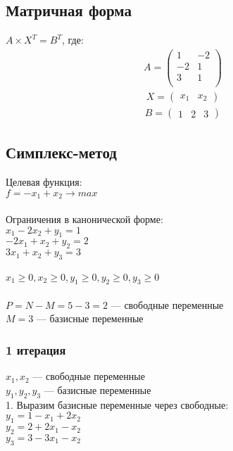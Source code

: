 \documentclass[14pt,a4paper,fleqn]{extarticle}
\begin{document}
\subsection*{Матричная форма}
$A \times X^T = B^T$, где:
\begin{align*}
	A = \begin{pmatrix}
		1 & -2\\
		-2 & 1 \\
		3 & 1 \\
		\end{pmatrix}
\end{align*}
\begin{align*}
	X = \begin{pmatrix}
		x_1 & x_2
		\end{pmatrix}
\end{align*}
\begin{align*}
	B = \begin{pmatrix}
		1 & 2 & 3
	\end{pmatrix}
\end{align*}
\subsection*{Симплекс-метод}
Целевая функция:\\
$f = -x_1 + x_2 \longrightarrow max$\\\\
Ограничения в канонической форме:\\
$x_1 - 2x_2 + y_1 = 1$\\
$-2x_1 + x_2 + y_2 = 2$\\
$3x_1 + x_2 + y_3 = 3$\\\\
$x_1 \geq 0, x_2 \geq 0, y_1 \geq 0, y_2 \geq 0, y_3 \geq 0$\\\\
$P = N - M = 5 - 3 = 2$ --- свободные переменные\\
$M = 3$ --- базисные переменные
\subsubsection*{1 итерация}
$x_1, x_2$ --- свободные переменные\\
$y_1, y_2, y_3$ --- базисные переменные\\

1. Выразим базисные переменные через свободные:\\
$y_1 = 1 - x_1 + 2x_2$\\
$y_2 = 2 + 2x_1 - x_2$\\
$y_3 = 3 - 3x_1 - x_2$\\
\end{document}
